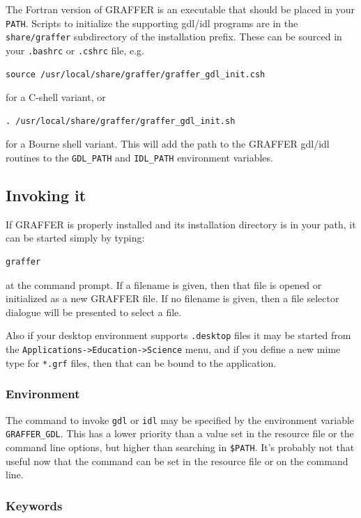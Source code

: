 \documentclass[11pt,twoside,english]{article}
\begin{document}
The Fortran version of GRAFFER is an executable that should be placed
in your \texttt{PATH}. Scripts to initialize the supporting gdl/idl
programs are in the \texttt{share/graffer} subdirectory of the
installation prefix. These can be sourced in your \texttt{.bashrc} or
\texttt{.cshrc} file, e.g.
\begin{verbatim}
source /usr/local/share/graffer/graffer_gdl_init.csh
\end{verbatim}
for a C-shell variant, or
\begin{verbatim}
. /usr/local/share/graffer/graffer_gdl_init.sh
\end{verbatim}
for a Bourne shell variant. This will add the path to the GRAFFER
gdl/idl routines to the \texttt{GDL\_PATH} and \texttt{IDL\_PATH}
environment variables.

\subsection{Invoking it}

If GRAFFER is properly installed and its installation directory is in
your path, it can be started simply by typing:
\begin{verbatim}
graffer
\end{verbatim}
at the command prompt. If a filename is given, then that file is opened
or initialized as a new GRAFFER file. If no filename is given, then a
file selector dialogue will be presented to select a file.

Also if your desktop environment supports \texttt{.desktop} files it
may be started from the \texttt{Applications->Education->Science} menu,
and if you define a new mime type for \texttt{*.grf} files, then that
can be bound to the application.

\subsubsection{Environment}
\label{sec:env}

The command to invoke \texttt{gdl} or \texttt{idl} may be specified by
the environment variable \texttt{GRAFFER\_GDL}. This has a lower
priority than a value set in the resource file or the command line
options, but higher than searching in \texttt{\$PATH}. It's probably
not that useful now that the command can be set in the resource file or
on the command line.

\subsubsection{Keywords}
\end{document}
